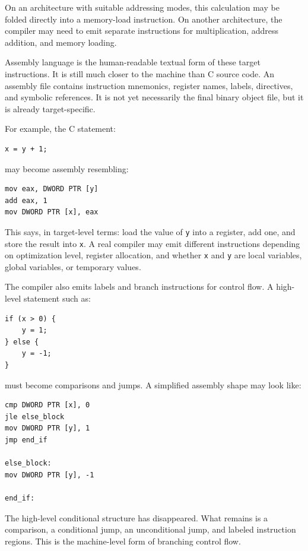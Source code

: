 On an architecture with suitable addressing modes, this calculation may be folded directly into a memory-load instruction. On another architecture, the compiler may need to emit separate instructions for multiplication, address addition, and memory loading.

Assembly language is the human-readable textual form of these target instructions. It is still much closer to the machine than C source code. An assembly file contains instruction mnemonics, register names, labels, directives, and symbolic references. It is not yet necessarily the final binary object file, but it is already target-specific.

For example, the C statement:

\begin{verbatim}
x = y + 1;
\end{verbatim}

may become assembly resembling:

\begin{verbatim}
mov eax, DWORD PTR [y]
add eax, 1
mov DWORD PTR [x], eax
\end{verbatim}

This says, in target-level terms: load the value of \texttt{y} into a register, add one, and store the result into \texttt{x}. A real compiler may emit different instructions depending on optimization level, register allocation, and whether \texttt{x} and \texttt{y} are local variables, global variables, or temporary values.

The compiler also emits labels and branch instructions for control flow. A high-level statement such as:

\begin{verbatim}
if (x > 0) {
    y = 1;
} else {
    y = -1;
}
\end{verbatim}

must become comparisons and jumps. A simplified assembly shape may look like:

\begin{verbatim}
cmp DWORD PTR [x], 0
jle else_block
mov DWORD PTR [y], 1
jmp end_if

else_block:
mov DWORD PTR [y], -1

end_if:
\end{verbatim}

The high-level conditional structure has disappeared. What remains is a comparison, a conditional jump, an unconditional jump, and labeled instruction regions. This is the machine-level form of branching control flow.

